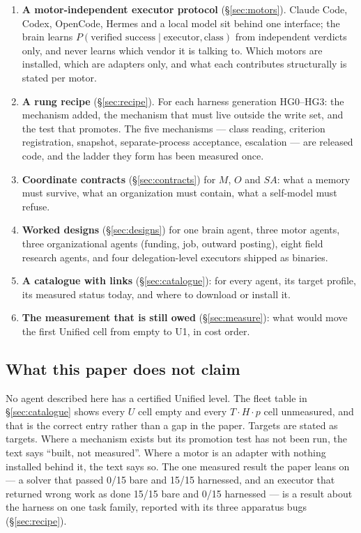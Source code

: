 \begin{enumerate}[leftmargin=*]
\item \textbf{A motor-independent executor protocol} (\S\ref{sec:motors}). Claude Code, Codex, OpenCode, Hermes and a local model sit behind one interface; the brain learns $P(\text{verified success} \mid \text{executor}, \text{class})$ from independent verdicts only, and never learns which vendor it is talking to. Which motors are installed, which are adapters only, and what each contributes structurally is stated per motor.
\item \textbf{A rung recipe} (\S\ref{sec:recipe}). For each harness generation HG0--HG3: the mechanism added, the mechanism that must live outside the write set, and the test that promotes. The five mechanisms --- class reading, criterion registration, snapshot, separate-process acceptance, escalation --- are released code, and the ladder they form has been measured once.
\item \textbf{Coordinate contracts} (\S\ref{sec:contracts}) for $M$, $O$ and $SA$: what a memory must survive, what an organization must contain, what a self-model must refuse.
\item \textbf{Worked designs} (\S\ref{sec:designs}) for one brain agent, three motor agents, three organizational agents (funding, job, outward posting), eight field research agents, and four delegation-level executors shipped as binaries.
\item \textbf{A catalogue with links} (\S\ref{sec:catalogue}): for every agent, its target profile, its measured status today, and where to download or install it.
\item \textbf{The measurement that is still owed} (\S\ref{sec:measure}): what would move the first Unified cell from empty to U1, in cost order.
\end{enumerate}

\subsection{What this paper does not claim}

No agent described here has a certified Unified level. The fleet table in \S\ref{sec:catalogue} shows every $U$ cell empty and every $T{\cdot}H{\cdot}p$ cell unmeasured, and that is the correct entry rather than a gap in the paper. Targets are stated as targets. Where a mechanism exists but its promotion test has not been run, the text says ``built, not measured''. Where a motor is an adapter with nothing installed behind it, the text says so. The one measured result the paper leans on --- a solver that passed 0/15 bare and 15/15 harnessed, and an executor that returned wrong work as done 15/15 bare and 0/15 harnessed --- is a result about the harness on one task family, reported with its three apparatus bugs (\S\ref{sec:recipe}).

